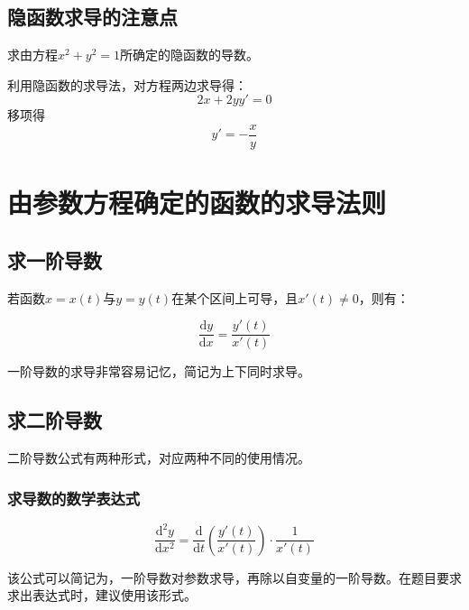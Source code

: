 \subsection{隐函数求导的注意点}\label{sec:2.7.2}

\begin{example}
	求由方程$x^2+y^2=1$所确定的隐函数的导数。
	
	利用隐函数的求导法，对方程两边求导得：
	\[2x+2yy'=0\]
	移项得
	\[y'=-\frac{x}{y}\]
\end{example}

\section{由参数方程确定的函数的求导法则}\label{sec:2.8}

\subsection{求一阶导数}\label{sec:2.8.1}

若函数$x=x(t)$与$y=y(t)$在某个区间上可导，且$x'(t)\neq 0$，则有：

\begin{equation}
	\frac{\mathrm{d}y}{\mathrm{d}x}=\frac{y'(t)}{x'(t)}\label{eq:2.7}
\end{equation}

\begin{remark}
	一阶导数的求导非常容易记忆，简记为上下同时求导。
\end{remark}

\subsection{求二阶导数}\label{sec:2.8.2}

二阶导数公式有两种形式，对应两种不同的使用情况。

\subsubsection{求导数的数学表达式}

\begin{equation}
	\frac{\mathrm{d}^2y}{\mathrm{d}x^2}=\frac{\mathrm{d}}{\mathrm{d}t}(\frac{y'(t)}{x'(t)})\cdot \frac{1}{x'(t)}\label{eq:2.8}
\end{equation}

\begin{remark}
	该公式可以简记为，一阶导数对参数求导，再除以自变量的一阶导数。在题目要求求出表达式时，建议使用该形式。
\end{remark}

